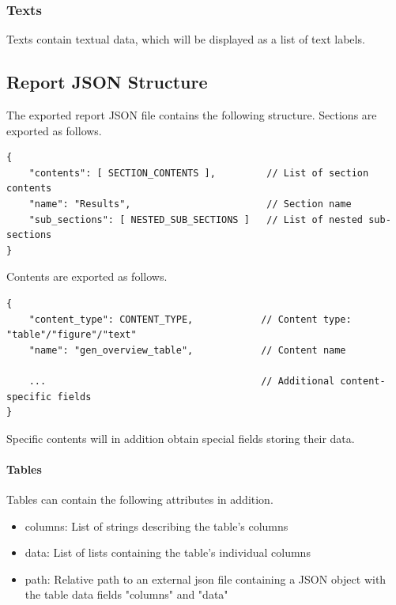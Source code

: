 \subsubsection{Texts} 
\label{sec:report_section_texts}

Texts contain textual data, which will be displayed as a list of text labels. \\

\subsection{Report JSON Structure}
\label{sec:report_json_struct}

The exported report JSON file contains the following structure. Sections are exported as follows.

\begin{lstlisting}[basicstyle=\small\ttfamily]
{
    "contents": [ SECTION_CONTENTS ],         // List of section contents
    "name": "Results",                        // Section name
    "sub_sections": [ NESTED_SUB_SECTIONS ]   // List of nested sub-sections
}
\end{lstlisting}

Contents are exported as follows.

\begin{lstlisting}[basicstyle=\small\ttfamily]
{
    "content_type": CONTENT_TYPE,            // Content type: "table"/"figure"/"text"
    "name": "gen_overview_table",            // Content name 
    
    ...                                      // Additional content-specific fields
}
\end{lstlisting}

Specific contents will in addition obtain special fields storing their data.

\paragraph{Tables} Tables can contain the following attributes in addition.

\begin{itemize}  
  \item columns: List of strings describing the table's columns
  \item data: List of lists containing the table's individual columns
  \item path: Relative path to an external json file containing a JSON object with the table data fields "columns" and "data"
\end{itemize}

